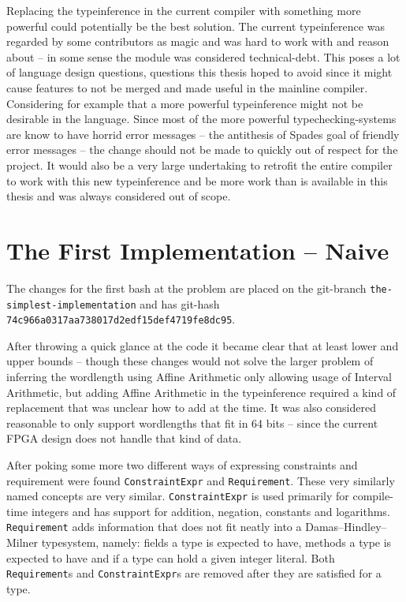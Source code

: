 Replacing the typeinference in the current compiler with something more powerful could potentially be the best solution. The current typeinference was regarded by some contributors as magic and was hard to work with and reason about -- in some sense the module was considered technical-debt. This poses a lot of language design questions, questions this thesis hoped to avoid since it might cause features to not be merged and made useful in the mainline compiler. Considering for example that a more powerful typeinference might not be desirable in the language. Since most of the more powerful typechecking-systems are know to have horrid error messages -- the antithesis of Spades goal of friendly error messages -- the change should not be made to quickly out of respect for the project. It would also be a very large undertaking to retrofit the entire compiler to work with this new typeinference and be more work than is available in this thesis and was always considered out of scope. 

\section{The First Implementation -- Naive}
\label{sec:First}
The changes for the first bash at the problem are placed on the git-branch \verb+the-simplest-implementation+ and has git-hash \verb+74c966a0317aa738017d2edf15def4719fe8dc95+.

After throwing a quick glance at the code it became clear that at least lower and upper bounds -- though these changes would not solve the larger problem of inferring the wordlength using Affine Arithmetic only allowing usage of Interval Arithmetic, but adding Affine Arithmetic in the typeinference required a kind of replacement that was unclear how to add at the time. It was also considered reasonable to only support wordlengths that fit in 64 bits -- since the current FPGA design does not handle that kind of data.

After poking some more two different ways of expressing constraints and requirement were found \verb+ConstraintExpr+ and \verb+Requirement+. These very similarly named concepts are very similar. \verb+ConstraintExpr+ is used primarily for compile-time integers and has support for addition, negation, constants and logarithms. \verb+Requirement+ adds information that does not fit neatly into a Damas–Hindley–Milner typesystem, namely: fields a type is expected to have, methods a type is expected to have and if a type can hold a given integer literal. Both \verb+Requirement+s and \verb+ConstraintExpr+s are removed after they are satisfied for a type.


